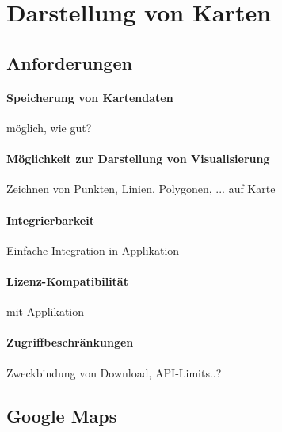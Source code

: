 \documentclass[11pt]{article} %
\begin{document}
\tableofcontents

\section{Darstellung von Karten}

\subsection{Anforderungen}

\paragraph{Speicherung von Kartendaten} möglich, wie gut? 

\paragraph{Möglichkeit zur Darstellung von Visualisierung} Zeichnen von Punkten, Linien, Polygonen, ... auf Karte

\paragraph{Integrierbarkeit} Einfache Integration in Applikation 

\paragraph{Lizenz-Kompatibilität} mit Applikation

\paragraph{Zugriffbeschränkungen} Zweckbindung von Download, API-Limits..?  

\subsection{Google Maps}
\end{document}
